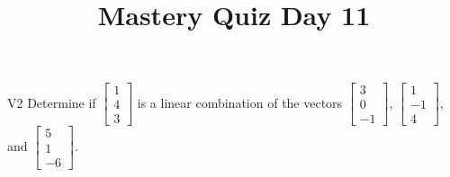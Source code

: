 \documentclass{sbgLAquiz}
\title{Mastery Quiz Day 11 }
\begin{document}
\begin{problem}{V2} Determine if $\begin{bmatrix} 1 \\ 4 \\ 3 \end{bmatrix}$ is a linear combination of the vectors $\begin{bmatrix} 3 \\ 0 \\ -1 \end{bmatrix}$, $\begin{bmatrix} 1 \\ -1 \\ 4 \end{bmatrix}$, and $\begin{bmatrix} 5 \\ 1 \\  -6 \end{bmatrix}$.
\end{problem}
\end{document}
